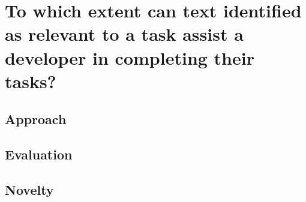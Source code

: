 

\section{To which extent can text identified as relevant to a task assist a developer in completing their tasks?}



\subsection{Approach}



\subsection{Evaluation}



\subsection{Novelty}